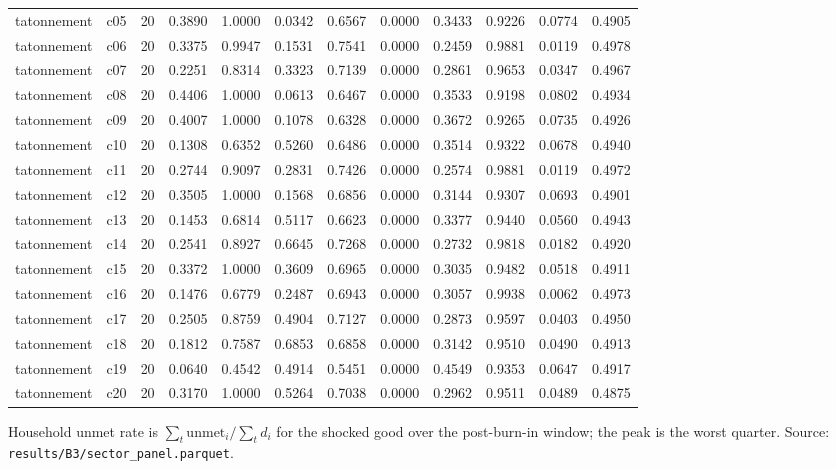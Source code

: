 \begin{table}[htbp]
\begin{tabular}{lrrrrrrrrrrr}
tatonnement & c05 & 20 & 0.3890 & 1.0000 & 0.0342 & 0.6567 & 0.0000 & 0.3433 & 0.9226 & 0.0774 & 0.4905 \\
tatonnement & c06 & 20 & 0.3375 & 0.9947 & 0.1531 & 0.7541 & 0.0000 & 0.2459 & 0.9881 & 0.0119 & 0.4978 \\
tatonnement & c07 & 20 & 0.2251 & 0.8314 & 0.3323 & 0.7139 & 0.0000 & 0.2861 & 0.9653 & 0.0347 & 0.4967 \\
tatonnement & c08 & 20 & 0.4406 & 1.0000 & 0.0613 & 0.6467 & 0.0000 & 0.3533 & 0.9198 & 0.0802 & 0.4934 \\
tatonnement & c09 & 20 & 0.4007 & 1.0000 & 0.1078 & 0.6328 & 0.0000 & 0.3672 & 0.9265 & 0.0735 & 0.4926 \\
tatonnement & c10 & 20 & 0.1308 & 0.6352 & 0.5260 & 0.6486 & 0.0000 & 0.3514 & 0.9322 & 0.0678 & 0.4940 \\
tatonnement & c11 & 20 & 0.2744 & 0.9097 & 0.2831 & 0.7426 & 0.0000 & 0.2574 & 0.9881 & 0.0119 & 0.4972 \\
tatonnement & c12 & 20 & 0.3505 & 1.0000 & 0.1568 & 0.6856 & 0.0000 & 0.3144 & 0.9307 & 0.0693 & 0.4901 \\
tatonnement & c13 & 20 & 0.1453 & 0.6814 & 0.5117 & 0.6623 & 0.0000 & 0.3377 & 0.9440 & 0.0560 & 0.4943 \\
tatonnement & c14 & 20 & 0.2541 & 0.8927 & 0.6645 & 0.7268 & 0.0000 & 0.2732 & 0.9818 & 0.0182 & 0.4920 \\
tatonnement & c15 & 20 & 0.3372 & 1.0000 & 0.3609 & 0.6965 & 0.0000 & 0.3035 & 0.9482 & 0.0518 & 0.4911 \\
tatonnement & c16 & 20 & 0.1476 & 0.6779 & 0.2487 & 0.6943 & 0.0000 & 0.3057 & 0.9938 & 0.0062 & 0.4973 \\
tatonnement & c17 & 20 & 0.2505 & 0.8759 & 0.4904 & 0.7127 & 0.0000 & 0.2873 & 0.9597 & 0.0403 & 0.4950 \\
tatonnement & c18 & 20 & 0.1812 & 0.7587 & 0.6853 & 0.6858 & 0.0000 & 0.3142 & 0.9510 & 0.0490 & 0.4913 \\
tatonnement & c19 & 20 & 0.0640 & 0.4542 & 0.4914 & 0.5451 & 0.0000 & 0.4549 & 0.9353 & 0.0647 & 0.4917 \\
tatonnement & c20 & 20 & 0.3170 & 1.0000 & 0.5264 & 0.7038 & 0.0000 & 0.2962 & 0.9511 & 0.0489 & 0.4875 \\
\bottomrule
\end{tabular}
\par\smallskip
\begin{minipage}{\linewidth}\footnotesize Household unmet rate is $\sum_t \mathrm{unmet}_i/\sum_t d_i$ for the shocked good over the post-burn-in window; the peak is the worst quarter. Source: \texttt{results/B3/sector\_panel.parquet}.\end{minipage}
\end{table}
